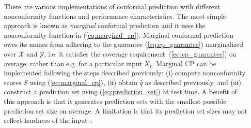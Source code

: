 \documentclass[11pt]{article}
\begin{document}





There are various implementations of conformal prediction with different nonconformity functions and performance characteristics.
The most simple approach is known as \emph{marginal} conformal prediction and it uses the nonconformity function in (\ref{eq:marginal_cp}). Marginal conformal prediction owes its names from adhering to the guarantee (\ref{eq:cp_guarantee}) marginalized over $\mathcal{X}$ and $\mathcal{Y}$, i.e. it satisfies the coverage requirement~(\ref{eq:cp_guarantee}) on average, rather than e.g. for a particular input $X_t$. 
Marginal CP can be implemented following the steps described previously: (i) compute nonconformity scores $S$ using (\ref{eq:marginal_cp}), (ii) obtain $\hat{q}$ as described previously, and (iii) construct a prediction set using (\ref{eq:prediction_set}) at test time. A benefit of this approach is that it generates prediction sets with the smallest possible prediction set size on average. A limitation is that its prediction set sizes may not reflect hardness of the input~\cite{sadinle2019least}.
\end{document}
